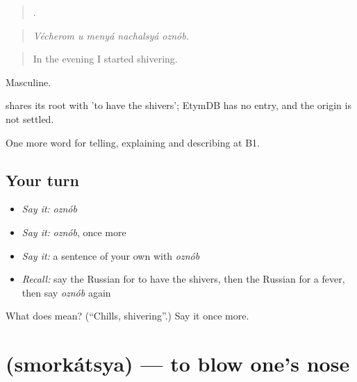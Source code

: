 \begin{quote}
    .
\end{quote}

\begin{quote}
\emph{Vécherom u menyá nachalsyá oznób.}
\end{quote}

\begin{quote}
In the evening I started shivering.
\end{quote}

Masculine.

\begin{cousinweb}
\emph{} shares its root with \emph{} 'to have the shivers'; EtymDB has no entry, and the origin is not settled.
\end{cousinweb}

\begin{grammarlens}[title={What you've built}]
One more word for telling, explaining and describing at B1.
\end{grammarlens}

\subsection*{Your turn}
\begin{itemize}
\raggedright
  \item \emph{Say it:} \emph{oznób}
  \item \emph{Say it:} \emph{oznób}, once more
  \item \emph{Say it:} a sentence of your own with \emph{oznób}
  \item \emph{Recall:} say the Russian for to have the shivers, then the Russian for a fever, then say \emph{oznób} again
\end{itemize}

\begin{tcolorbox}[breakable,colback=teal!4,colframe=teal!35!black,title={Before you move on}]
What does  mean? (\textquotedblleft{}Chills, shivering\textquotedblright{}.) Say it once more.
\end{tcolorbox}
\section[\texorpdfstring{\ru{сморкаться} (smorkátsya)}{сморкаться (smorkátsya)}]{ (smorkátsya) — to blow one's nose}

\label{lesson:RU-C486-smorkatsya}



